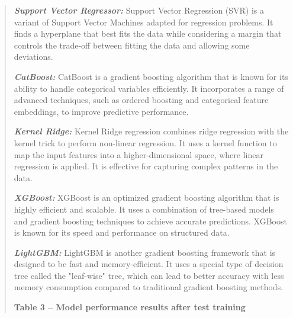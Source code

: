 \begin{quote}
\emph{{\bfseries Support Vector Regressor:}} Support Vector Regression
(SVR) is a variant of Support Vector Machines adapted for regression
problems. It finds a hyperplane that best fits the data while
considering a margin that controls the trade-off between fitting the
data and allowing some deviations.

\emph{{\bfseries CatBoost:}} CatBoost is a gradient boosting algorithm that
is known for its ability to handle categorical variables efficiently. It
incorporates a range of advanced techniques, such as ordered boosting
and categorical feature embeddings, to improve predictive performance.

\emph{{\bfseries Kernel Ridge:}} Kernel Ridge regression combines ridge
regression with the kernel trick to perform non-linear regression. It
uses a kernel function to map the input features into a
higher-dimensional space, where linear regression is applied. It is
effective for capturing complex patterns in the data.

\emph{{\bfseries XGBoost:}} XGBoost is an optimized gradient boosting
algorithm that is highly efficient and scalable. It uses a combination
of tree-based models and gradient boosting techniques to achieve
accurate predictions. XGBoost is known for its speed and performance on
structured data.

\emph{{\bfseries LightGBM:}} LightGBM is another gradient boosting
framework that is designed to be fast and memory-efficient. It uses a
special type of decision tree called the "leaf-wise" tree, which can
lead to better accuracy with less memory consumption compared to
traditional gradient boosting methods.

{\bfseries Table 3 -- Model performance results after test training}
\end{quote}

